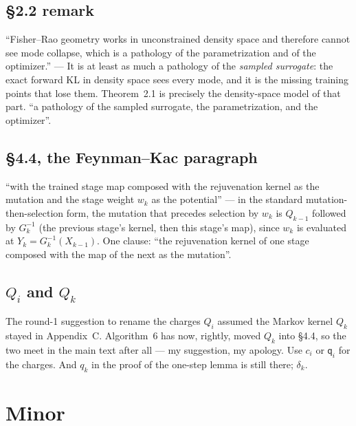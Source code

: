 \documentclass[11pt]{article}
\begin{document}
\subsection{\S2.2 remark}

``Fisher--Rao geometry works in unconstrained density space and therefore
cannot see mode collapse, which is a pathology of the parametrization and of
the optimizer.'' --- It is at least as much a pathology of the \emph{sampled
surrogate}: the exact forward KL in density space sees every mode, and it is
the missing training points that lose them. Theorem~2.1 is precisely the
density-space model of that part. ``a pathology of the sampled surrogate, the
parametrization, and the optimizer''.

\subsection{\S4.4, the Feynman--Kac paragraph}

``with the trained stage map composed with the rejuvenation kernel as the
mutation and the stage weight $w_k$ as the potential'' --- in the standard
mutation-then-selection form, the mutation that precedes selection by $w_k$ is
$Q_{k-1}$ followed by $G_k^{-1}$ (the previous stage's kernel, then this
stage's map), since $w_k$ is evaluated at $Y_k=G_k^{-1}(X_{k-1})$. One
clause: ``the rejuvenation kernel of one stage composed with the map of the
next as the mutation''.

\subsection{$Q_i$ and $Q_k$}
\label{sec:Q}

The round-1 suggestion to rename the charges $Q_i$ assumed the Markov kernel
$Q_k$ stayed in Appendix~C. Algorithm~6 has now, rightly, moved $Q_k$ into
\S4.4, so the two meet in the main text after all --- my suggestion, my
apology. Use $c_i$ or $\mathsf q_i$ for the charges. And $q_k$ in the proof of
the one-step lemma is still there; $\delta_k$.

\section{Minor}
\end{document}
